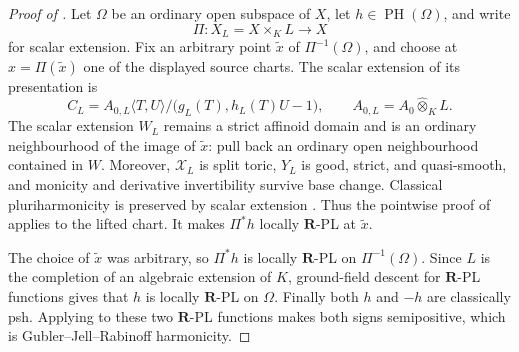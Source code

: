 
\begin{proof}[Proof of
]
Let \(\Omega\) be an ordinary open subspace of \(X\), let
\(h\in\operatorname{PH}(\Omega)\), and write
\[
                     \Pi:X_L=X\times_KL\longrightarrow X
\]
for scalar extension.  Fix an arbitrary point \(\widetilde x\) of
\(\Pi^{-1}(\Omega)\), and choose at \(x=\Pi(\widetilde x)\) one of the
displayed source charts.  The scalar extension of its presentation is
\[
 C_L=A_{0,L}\langle T,U\rangle/
       \bigl(g_L(T),h_L(T)U-1\bigr),
 \qquad A_{0,L}=A_0\widehat\otimes_KL.
\]
The scalar extension \(W_L\) remains a strict affinoid domain and is an
ordinary neighbourhood of the image of \(\widetilde x\): pull back an
ordinary open neighbourhood contained in \(W\).  Moreover,
\(\mathcal X_L\) is split toric, \(Y_L\) is good, strict, and
quasi-smooth, and monicity and derivative invertibility survive base change.
Classical pluriharmonicity is preserved by scalar extension
\cite[Proposition~7.2(6)]{GR25Classical}.  Thus the pointwise proof of
 applies to the lifted
chart.  It makes \(\Pi^*h\) locally \(\mathbf R\)-PL at
\(\widetilde x\).

The choice of \(\widetilde x\) was arbitrary, so \(\Pi^*h\) is locally
\(\mathbf R\)-PL on \(\Pi^{-1}(\Omega)\).  Since \(L\) is the completion
of an algebraic extension of \(K\), ground-field descent for
\(\mathbf R\)-PL functions \cite[Corollary~5.12]{GJR26} gives that \(h\)
is locally \(\mathbf R\)-PL on \(\Omega\).  Finally both \(h\) and \(-h\)
are classically psh.  Applying \cite[Theorem~4.3]{GR25Classical} to these
two \(\mathbf R\)-PL functions makes both signs semipositive, which is
Gubler--Jell--Rabinoff harmonicity.
\end{proof}
